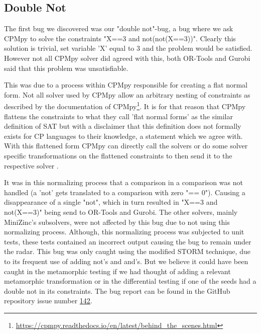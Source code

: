 \subsection{Double Not}
\label{res:bug:DoubleNot}
The first bug we discovered was our "double not"-bug, a bug where we ask CPMpy to solve the constraints "X==3 and not(not(X==3))". Clearly this solution is trivial, set variable 'X' equal to 3 and the problem would be satisfied. However not all CPMpy solver did agreed with this, both OR-Tools and Gurobi said that this problem was unsatisfiable. 

This was due to a process within CPMpy responsible for creating a flat normal form. Not all solver used by CPMpy allow an arbitrary nesting of constraints as described by the documentation of CPMpy\footnote{\url{https://cpmpy.readthedocs.io/en/latest/behind_the_scenes.html}}. It is for that reason that CPMpy flattens the constraints to what they call 'flat normal forms' as the similar definition of SAT but with a disclaimer that this definition does not formally exists for CP languages to their knowledge, a statement which we agree with. With this flattened form CPMpy can directly call the solvers or do some solver specific transformations on the flattened constraints to then send it to the respective solver \cite{CPMpyGithub}. 

It was in this normalizing process that a comparison in a comparison was not handled (a 'not' gets translated to a comparison with zero "== 0"). Causing a disappearance of a single "not", which in turn resulted in "X==3 and not(X==3)" being send to OR-Tools and Gurobi. The other solvers, mainly MiniZinc's subsolvers, were not affected by this bug due to not using this normalizing process. Although, this normalizing process was subjected to unit tests, these tests contained an incorrect output causing the bug to remain under the radar. This bug was only caught using the modified STORM technique, due to its frequent use of adding not's and and's. But we believe it could have been caught in the metamorphic testing if we had thought of adding a relevant metamorphic transformation or in the differential testing if one of the seeds had a double not in its constraints. The bug report can be found in the GitHub repository issue number \href{https://github.com/CPMpy/cpmpy/issues/142}{142}.

